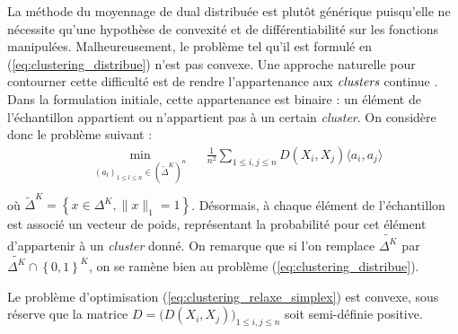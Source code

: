 \documentclass[a4paper]{article}
\begin{document}
La méthode du moyennage de dual distribuée est plutôt générique puisqu'elle
ne nécessite qu'une hypothèse de convexité et de différentiabilité sur les
fonctions manipulées. Malheureusement, le problème tel qu'il est formulé en
(\ref{eq:clustering_distribue}) n'est pas convexe. Une approche naturelle pour
contourner cette difficulté est de rendre l'appartenance aux $\emph{clusters}$
\og continue \fg{}. Dans la formulation initiale, cette appartenance est binaire : un
élément de l'échantillon appartient ou n'appartient pas à un certain
\emph{cluster}. On considère donc le problème suivant :
\begin{equation}
    \label{eq:clustering_relaxe_simplex}
    \begin{aligned}
        & \min_{(a_l)_{1 \leq l \leq n} \in (\tilde{\Delta}^K)^n}
        && \frac{1}{n^2}\sum_{1 \leq i,j \leq n} D(X_i, X_j) \langle a_i, a_j \rangle \\
    \end{aligned}
\end{equation}
où $\tilde{\Delta}^K = \left\{x \in \Delta^K, \|x\|_1 = 1  \right\}$.
Désormais, à chaque élément de l'échantillon est associé un vecteur de poids,
représentant la probabilité pour cet élément d'appartenir à un \emph{cluster}
donné. On remarque que si l'on remplace $\tilde{\Delta^K}$ par
$\tilde{\Delta^K} \cap \left\{ 0, 1 \right\}^K$,
on se ramène bien au problème (\ref{eq:clustering_distribue}).

Le problème d'optimisation (\ref{eq:clustering_relaxe_simplex}) est convexe,
sous réserve que la matrice $D = \big(D(X_i, X_j)\big)_{1 \leq i,j \leq n}$
soit semi-définie positive.



\end{document}
